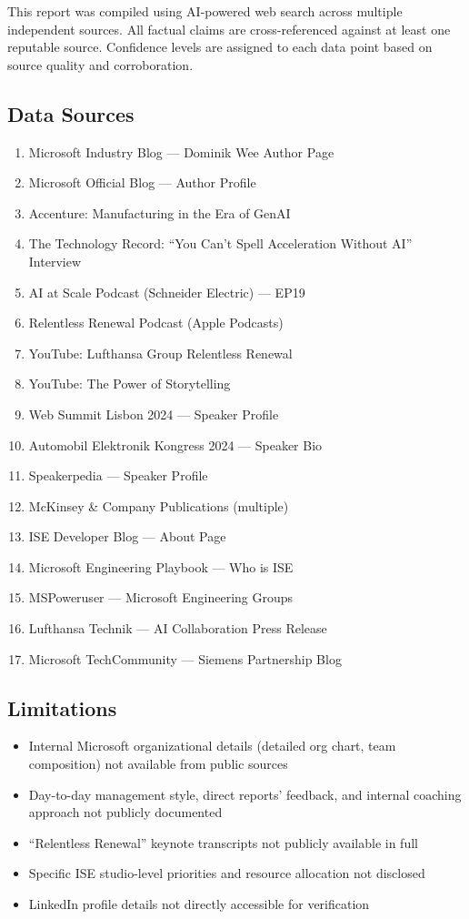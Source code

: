 \documentclass[11pt,a4paper]{article}
\begin{document}
This report was compiled using AI-powered web search across multiple independent sources. All factual claims are cross-referenced against at least one reputable source. Confidence levels are assigned to each data point based on source quality and corroboration.

\subsection{Data Sources}

\begin{enumerate}
    \item Microsoft Industry Blog --- Dominik Wee Author Page
    \item Microsoft Official Blog --- Author Profile
    \item Accenture: Manufacturing in the Era of GenAI
    \item The Technology Record: ``You Can't Spell Acceleration Without AI'' Interview
    \item AI at Scale Podcast (Schneider Electric) --- EP19
    \item Relentless Renewal Podcast (Apple Podcasts)
    \item YouTube: Lufthansa Group Relentless Renewal
    \item YouTube: The Power of Storytelling
    \item Web Summit Lisbon 2024 --- Speaker Profile
    \item Automobil Elektronik Kongress 2024 --- Speaker Bio
    \item Speakerpedia --- Speaker Profile
    \item McKinsey \& Company Publications (multiple)
    \item ISE Developer Blog --- About Page
    \item Microsoft Engineering Playbook --- Who is ISE
    \item MSPoweruser --- Microsoft Engineering Groups
    \item Lufthansa Technik --- AI Collaboration Press Release
    \item Microsoft TechCommunity --- Siemens Partnership Blog
\end{enumerate}

\subsection{Limitations}

\begin{itemize}
    \item Internal Microsoft organizational details (detailed org chart, team composition) not available from public sources
    \item Day-to-day management style, direct reports' feedback, and internal coaching approach not publicly documented
    \item ``Relentless Renewal'' keynote transcripts not publicly available in full
    \item Specific ISE studio-level priorities and resource allocation not disclosed
    \item LinkedIn profile details not directly accessible for verification
\end{itemize}
\end{document}
